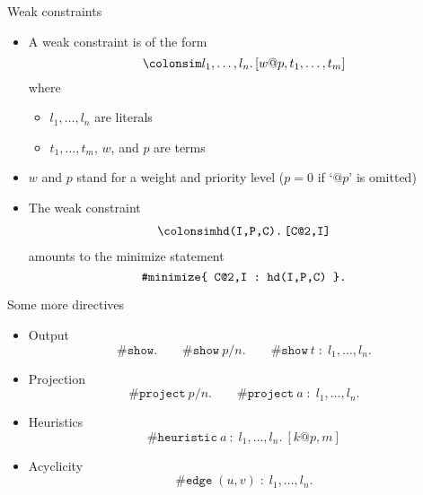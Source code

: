 \begin{frame}{Weak constraints}
  \begin{itemize}
  \item {} A \alert{weak constraint} is of the form
    \[
    \colonsim  l_1,\dots, l_n.\, [ w@p,t_1, \dots, t_m ]
    \]
    where 
    \begin{itemize}
    \item $l_1, \dots,  l_n$ are literals
    \item $t_1, \dots, t_m$, $w$, and $p$ are terms
    \end{itemize}
  \item<2-> $w$ and $p$ stand for a weight and priority level ($p=0$ if `$@p$' is omitted)
  \item<3->  
    The weak constraint
    \begin{align*}
      \colonsim \text{\texttt{hd(I,P,C).}}\,\text{\texttt{[C@2,I]}}
    \end{align*}
    \pause[4] amounts to the minimize statement
    \[
      \text{\texttt{\#minimize\{ C@2,I : hd(I,P,C) \}.}}
    \]
  \end{itemize}
\end{frame}
\begin{frame}{Some more directives}
  \begin{itemize}
  \item<1-> Output
    \[
      \#\mathtt{show}.\qquad \#\mathtt{show} \ p/n.\qquad \#\mathtt{show} \ t\; :\; l_1,\dots,l_n.
    \]
  \item<2-> Projection
    \[
      \#\mathtt{project} \ p/n.\qquad \#\mathtt{project} \ a\; :\; l_1,\dots,l_n.
    \]
  \item<3-> Heuristics
    \[
      \#\mathtt{heuristic} \ a\ :\; l_1,\dots,l_n. \ [k@p,m]
    \]
  \item<4-> Acyclicity
    \[
      \#\mathtt{edge}\; (u,v)\; :\; l_1,\dots,l_n.
    \]
  \end{itemize}
\end{frame}
